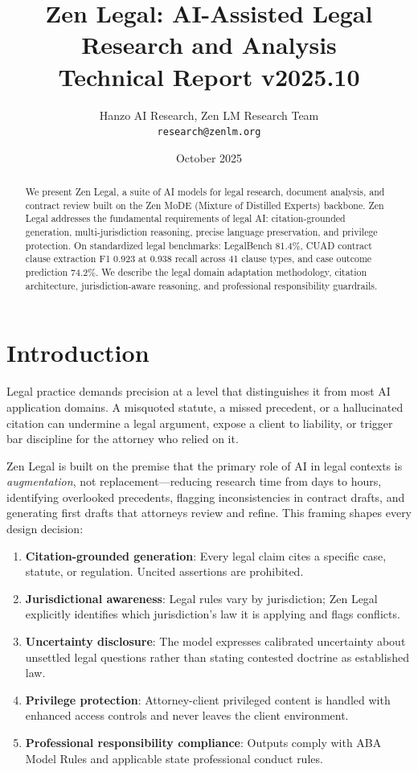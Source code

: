 \documentclass[11pt,a4paper]{article}
\title{\textbf{Zen Legal: AI-Assisted Legal Research and Analysis}\\
\large Technical Report v2025.10}
\author{Hanzo AI Research, Zen LM Research Team\\
\texttt{research@zenlm.org}}
\date{October 2025}
\begin{document}
\maketitle

\begin{abstract}
We present Zen Legal, a suite of AI models for legal research, document analysis, and contract review built on the Zen MoDE (Mixture of Distilled Experts) backbone. Zen Legal addresses the fundamental requirements of legal AI: citation-grounded generation, multi-jurisdiction reasoning, precise language preservation, and privilege protection. On standardized legal benchmarks: LegalBench 81.4\%, CUAD contract clause extraction F1 0.923 at 0.938 recall across 41 clause types, and case outcome prediction 74.2\%. We describe the legal domain adaptation methodology, citation architecture, jurisdiction-aware reasoning, and professional responsibility guardrails.
\end{abstract}

\section{Introduction}

Legal practice demands precision at a level that distinguishes it from most AI application domains. A misquoted statute, a missed precedent, or a hallucinated citation can undermine a legal argument, expose a client to liability, or trigger bar discipline for the attorney who relied on it.

Zen Legal is built on the premise that the primary role of AI in legal contexts is \emph{augmentation}, not replacement—reducing research time from days to hours, identifying overlooked precedents, flagging inconsistencies in contract drafts, and generating first drafts that attorneys review and refine. This framing shapes every design decision:

\begin{enumerate}
  \item \textbf{Citation-grounded generation}: Every legal claim cites a specific case, statute, or regulation. Uncited assertions are prohibited.
  \item \textbf{Jurisdictional awareness}: Legal rules vary by jurisdiction; Zen Legal explicitly identifies which jurisdiction's law it is applying and flags conflicts.
  \item \textbf{Uncertainty disclosure}: The model expresses calibrated uncertainty about unsettled legal questions rather than stating contested doctrine as established law.
  \item \textbf{Privilege protection}: Attorney-client privileged content is handled with enhanced access controls and never leaves the client environment.
  \item \textbf{Professional responsibility compliance}: Outputs comply with ABA Model Rules and applicable state professional conduct rules.
\end{enumerate}
\end{document}
